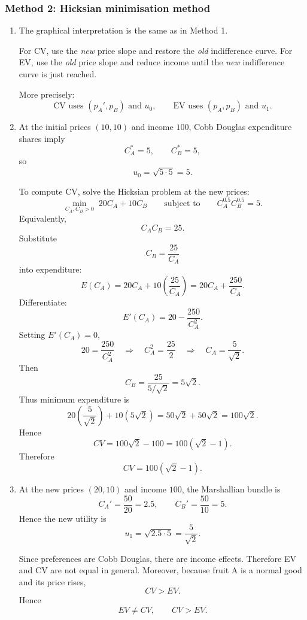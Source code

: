 \documentclass[12pt]{article}
\begin{document}
\newpage
\subsubsection{Method 2: Hicksian minimisation method}
\begin{enumerate}[label=(\alph*)]
    \item
    The graphical interpretation is the same as in Method 1.

    For CV, use the \emph{new} price slope and restore the \emph{old} indifference curve.  
    For EV, use the \emph{old} price slope and reduce income until the \emph{new} indifference curve is just reached.

    More precisely:
    \[
    \text{CV uses }(p_A',p_B)\text{ and }u_0,
    \qquad
    \text{EV uses }(p_A,p_B)\text{ and }u_1.
    \]

    \item
    At the initial prices \((10,10)\) and income \(100\), Cobb Douglas expenditure shares imply
    \[
    C_A^*=5,\qquad C_B^*=5,
    \]
    so
    \[
    u_0=\sqrt{5\cdot 5}=5.
    \]

    To compute CV, solve the Hicksian problem at the new prices:
    \[
    \min_{C_A,C_B>0}\;20C_A+10C_B
    \qquad\text{subject to}\qquad
    C_A^{0.5}C_B^{0.5}=5.
    \]
    Equivalently,
    \[
    C_AC_B=25.
    \]
    Substitute
    \[
    C_B=\frac{25}{C_A}
    \]
    into expenditure:
    \[
    E(C_A)=20C_A+10\left(\frac{25}{C_A}\right)
    =20C_A+\frac{250}{C_A}.
    \]
    Differentiate:
    \[
    E'(C_A)=20-\frac{250}{C_A^2}.
    \]
    Setting \(E'(C_A)=0\),
    \[
    20=\frac{250}{C_A^2}
    \quad\Longrightarrow\quad
    C_A^2=\frac{25}{2}
    \quad\Longrightarrow\quad
    C_A=\frac{5}{\sqrt2}.
    \]
    Then
    \[
    C_B=\frac{25}{5/\sqrt2}=5\sqrt2.
    \]
    Thus minimum expenditure is
    \[
    20\left(\frac{5}{\sqrt2}\right)+10(5\sqrt2)
    =50\sqrt2+50\sqrt2
    =100\sqrt2.
    \]
    Hence
    \[
    CV=100\sqrt2-100=100(\sqrt2-1).
    \]
    Therefore
    \[
    \boxed{CV=100(\sqrt2-1).}
    \]

    \item
    At the new prices \((20,10)\) and income \(100\), the Marshallian bundle is
    \[
    C_A'=\frac{50}{20}=2.5,
    \qquad
    C_B'=\frac{50}{10}=5.
    \]
    Hence the new utility is
    \[
    u_1=\sqrt{2.5\cdot 5}=\frac{5}{\sqrt2}.
    \]

    Since preferences are Cobb Douglas, there are income effects. Therefore EV and CV are not equal in general. Moreover, because fruit A is a normal good and its price rises,
    \[
    CV>EV.
    \]
    Hence
    \[
    \boxed{EV\neq CV,\qquad CV>EV.}
    \]
\end{enumerate}
\end{document}
